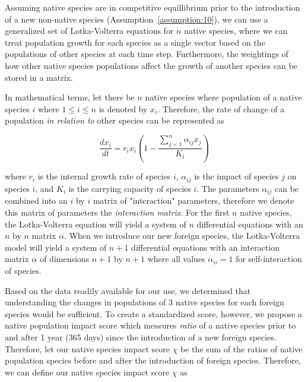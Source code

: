 Assuming native species are in competitive equillibrium prior to the introduction of a new non-native species (Assumption~\ref{assumption:10}), we can use a generalized set of Lotka-Volterra equations for \(n\) native species, where we can treat population growth for each species as a single vector based on the populations of other species at each time step. Furthermore, the weightings of how other native species populations affect the growth of another species can be stored in a matrix.

In mathematical terms, let there be \(n\) native species where population of a native species \(i\) where \(1 \leq i \leq n\) is denoted by \(x_i\). Therefore, the rate of change of a population \textit{in relation to} other species can be represented as 

\begin{equation}
    \frac{dx_i}{dt} = r_ix_i \left(1 - \frac{\sum\limits_{j=1}^n \alpha_{ij} x_j}{K_i}\right)
    \label{eq:lotkavolterra}
\end{equation}

where \(r_i\) is the internal growth rate of species \(i\), \(\alpha_{ij}\) is the impact of species \(j\) on species \(i\), and \(K_i\) is the carrying capacity of species \(i\). The parameters \(\alpha_{ij}\) can be combined into an \(i\) by \(i\) matrix of "interaction" parameters, therefore we denote this matrix of parameters the \textit{interaction matrix}. For the first \(n\) native species, the Lotka-Volterra equation will yield a system of \(n\) differential equations with an \(n\) by \(n\) matrix \(\alpha\). When we introduce our new foreign species, the Lotka-Volterra model will yield a system of \(n+1\) differential equations with an interaction matrix \(\alpha\) of dimensions \(n+1\) by \(n+1\) where all values \(\alpha_{ii} = 1\) for self-interaction of species.

Based on the data readily available for our use, we determined that understanding the changes in populations of 3 native species for each foreign species would be sufficient. To create a standardized score, however, we propose a native population impact score which measures \textit{ratio} of a native species prior to and after 1 year (365 days) since the introduction of a new foreign species. Therefore, let our native species impact score \(\chi\) be the sum of the ratios of native population species before and after the introduction of foreign species. Therefore, we can define our native species impact score \(\chi\) as 

